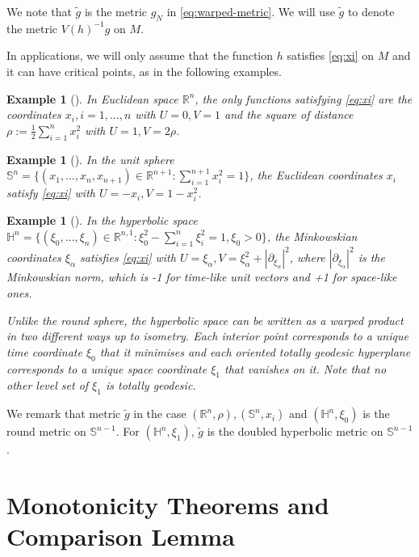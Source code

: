\documentclass[11pt]{article}
\newtheorem{exampl}[theorem]{Example}
\begin{document}
We note that \(\tilde g\) is the metric \(g_N\) in \eqref{eq:warped-metric}. We will use
\(\tilde g\) to denote the metric \(V(h)^{-1}g\) on \(M\). 

In applications, we will only assume that the function \(h\) satisfies
\eqref{eq:xi} on \(M\) and it can have critical points, as in the following examples.

\begin{exampl}[]
\label{ex:xi-R}
In Euclidean space \(\mathbb{R}^n\), the only functions satisfying
   \eqref{eq:xi} are the coordinates \(x_i, i=1,\dots,n\) with \(U=0, V=1\) and the square of distance \(\rho := \frac{1}{2}\sum_{i=1}^n
   x_i^2\) with \(U= 1, V = 2\rho\).
\end{exampl}

\begin{exampl}[]
\label{ex:xi-S}
In the unit sphere \(\mathbb{S}^n = \{(x_1,\dots, x_n, x_{n+1})\in
\mathbb{R}^{n+1}:\sum_{i=1}^{n+1} x_i^2 = 1\}\), the Euclidean coordinates \(x_i\)
 satisfy \eqref{eq:xi} with \(U = -x_i, V = 1-x_i^2\). 
\end{exampl}

\begin{exampl}[]
\label{ex:xi-H}
In the hyperbolic space \(\mathbb{H}^n=\{(\xi_0,\dots,\xi_n)\in \mathbb{R}^{n,1}:
   \xi_0^2 - \sum_{i=1}^n\xi_i^2=1, \xi_0 > 0\}\), the Minkowskian coordinates \(\xi_\alpha\) satisfies
   \eqref{eq:xi} with \(U=\xi_\alpha, V = \xi_\alpha^2 + |\partial_{\xi_\alpha}|^2\),
   where  \(|\partial_{\xi_\alpha}|^2\) is the Minkowskian norm, which is -1 for
   time-like unit
   vectors and +1 for space-like ones.

Unlike the round sphere, the hyperbolic space can be written as a warped
product in two different ways up to isometry. Each interior point corresponds to a
unique time coordinate \(\xi_0\) that it minimises and 
each oriented totally geodesic hyperplane
corresponds to a unique space coordinate \(\xi_1\) that
vanishes on it. Note that no other level set of \(\xi_1\) is totally
geodesic.
\end{exampl}

We remark that metric \(\tilde g\) in the case \((\mathbb{R}^n, \rho), (\mathbb{S}^n, x_i)\) and
   \((\mathbb{H}^n, \xi_0)\) is the round metric on \(\mathbb{S}^{n-1}\). For \((\mathbb{H}^n, \xi_1)\), \(\tilde g\)
   is the doubled hyperbolic metric on \(\mathbb{S}^{n-1}\). 

\section{Monotonicity Theorems and Comparison Lemma}
\label{sec:orgf611f4b}
\end{document}
